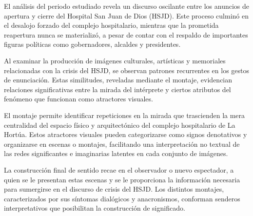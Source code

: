 

El análisis del periodo estudiado revela un discurso oscilante entre los anuncios de apertura y cierre del Hospital San Juan de Dios (HSJD). Este proceso culminó en el desalojo forzado del complejo hospitalario, mientras que la prometida reapertura nunca se materializó, a pesar de contar con el respaldo de importantes figuras políticas como gobernadores, alcaldes y presidentes.

Al examinar la producción de imágenes culturales, artísticas y memoriales relacionadas con la crisis del HSJD, se observan patrones recurrentes en los gestos de enunciación. Estas similitudes, reveladas mediante el montaje, evidencian relaciones significativas entre la mirada del intérprete y ciertos atributos del fenómeno que funcionan como atractores visuales.

El montaje permite identificar repeticiones en la mirada que trascienden la mera centralidad del espacio físico y arquitectónico del complejo hospitalario de La Hortúa. Estos atractores visuales pueden categorizarse como signos denotativos y organizarse en escenas o montajes, facilitando una interpretación no textual de las redes significantes e imaginarias latentes en cada conjunto de imágenes.

La construcción final de sentido recae en el observador o nuevo espectador, a quien se le presentan estas escenas y se le proporciona la información necesaria para sumergirse en el discurso de crisis del HSJD. Los distintos montajes, caracterizados por sus síntomas dialógicos y anacronismos, conforman senderos interpretativos que posibilitan la construcción de significado.

